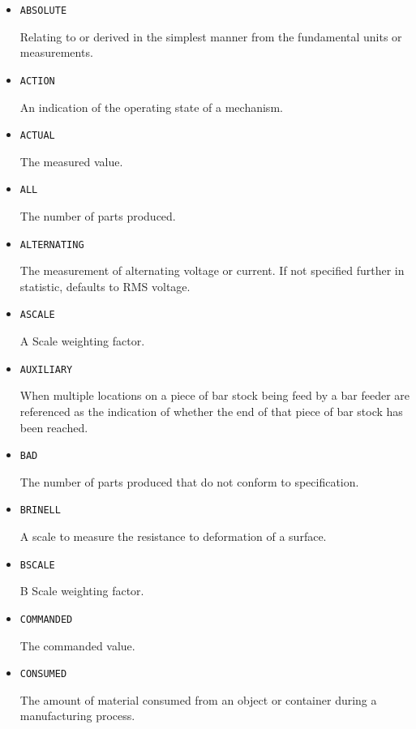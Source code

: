 \begin{itemize}


\item \texttt{ABSOLUTE}  

Relating to or derived in the simplest manner from the fundamental units or measurements.


\item \texttt{ACTION}  

An indication of the operating state of a mechanism.


\item \texttt{ACTUAL}  

The measured value.


\item \texttt{ALL}  

The number of parts produced.


\item \texttt{ALTERNATING}  

The measurement of alternating voltage or current.   If not specified further in statistic, defaults to RMS voltage. 


\item \texttt{A\textunderscore SCALE}  

A Scale weighting factor.


\item \texttt{AUXILIARY}  

When multiple locations on a piece of bar stock being feed by a bar feeder are referenced as the indication of whether the end of that piece of bar stock has been reached.


\item \texttt{BAD}  

The number of parts produced that do not conform to specification.


\item \texttt{BRINELL}  

A scale to measure the resistance to deformation of a surface.


\item \texttt{B\textunderscore SCALE}  

B Scale weighting factor.


\item \texttt{COMMANDED}  

The commanded value.


\item \texttt{CONSUMED}  

The amount of material consumed from an object or container during a manufacturing process.



\end{itemize}
